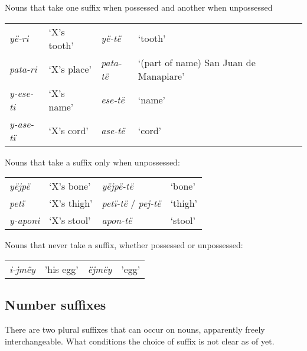 \documentclass{memoir}
\begin{document}
\ex\label{diffpossessed} Nouns that take one suffix when possessed and
another when unpossessed

\begin{tabular}[t]{llll}

   \emph{yë-ri} & ‘X’s tooth’ &   \emph{yë-të} &                                ‘tooth’ \\

 \emph{pata-ri} & ‘X’s place’ & \emph{pata-të} & ‘(part of name) San Juan de Manapiare’ \\
\emph{y-ese-ti} & ‘X’s name’  &  \emph{ese-të} &                                 ‘name’ \\
\emph{y-ase-tï} & ‘X’s cord’  &  \emph{ase-të} &                                 ‘cord’ \\

\end{tabular}
 \xe

\ex\label{suffunpossessed} Nouns that take a suffix only when
unpossessed:

\begin{tabular}[t]{llll}

  \emph{yëjpë} &  ‘X’s bone’ &                \emph{yëjpë-të} &  ‘bone’ \\

   \emph{petï} & ‘X’s thigh’ & \emph{petï-të} / \emph{pej-të} & ‘thigh’ \\
\emph{y-aponi} & ‘X’s stool’ &                 \emph{apon-të} & ‘stool’ \\

\end{tabular}
 \xe

\ex\label{unsuffixednouns} Nouns that never take a suffix, whether
possessed or unpossessed:

\begin{tabular}[t]{llll}

\emph{i-jmëy} & 'his egg’ & \emph{ëjmëy} & 'egg’ \\

\end{tabular}
 \xe

\subsection{\texorpdfstring{Number suffixes
\label{sec:nominalnumber}}{Number suffixes }}

There are two plural suffixes that can occur on nouns, apparently freely
interchangeable. What conditions the choice of suffix is not clear as of
yet.
\end{document}
